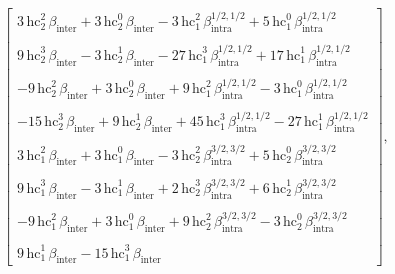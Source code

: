 \documentclass[aps,prb,onecolumn,nofootinbib,citeautoscript,10pt, showkeys]{revtex4-2}
\begin{document}
{\tiny
\begin{align*}
  \begin{bmatrix}
3 \, \text{hc}_2^2 \, \beta_{\text{inter}}
+ 3  \, \text{hc}_2^0 \,  \beta_{\text{inter}}
-3  \, \text{hc}_1^2\,  \beta_{\text{intra}}^{1/2, 1/2}
+5  \, \text{hc}_1^0 \,  \beta_{\text{intra}}^{1/2, 1/2} \\ \\
 9  \, \text{hc}_2^3 \,\beta_{\text{inter}}-3  \, \text{hc}_2^{1} \, \beta_{\text{inter}}
 -27  \, \text{hc}_1^3 \,\beta_{\text{intra}}^{1/2, 1/2}+
   17  \, \text{hc}_1^{1} \, \beta_{\text{intra}}^{1/2, 1/2} \\ \\
 -9  \, \text{hc}_2^2 \,\beta_{\text{inter}}+3  \, \text{hc}_2^0 \,  \beta_{\text{inter}}
 +9  \, \text{hc}_1^2 \,\beta_{\text{intra}}^{1/2, 1/2}
 -3 \, \text{hc}_1^0 \,  \beta_{\text{intra}}^{1/2, 1/2} \\ \\
 -15  \, \text{hc}_2^3 \,\beta_{\text{inter}}
 + 9  \, \text{hc}_2^{1} \, \beta_{\text{inter}}
 +45  \, \text{hc}_1^3 \, \beta_{\text{intra}}^{1/2, 1/2}
 -27  \, \text{hc}_1^{1} \, \beta_{\text{intra}}^{1/2, 1/2} \\ \\
 3  \, \text{hc}_1^2\, \beta_{\text{inter}}+3  \, \text{hc}_1^0 \,  \beta_{\text{inter}}
 -3  \, \text{hc}_2^2\, \beta_{\text{intra}}^{3/2, 3/2}
 +5 \, \text{hc}_2^0 \,  \beta_{\text{intra}}^{3/2, 3/2} \\ \\
 9  \, \text{hc}_1^3 \, \beta_{\text{inter}}
 -3  \, \text{hc}_1^{1} \, \beta_{\text{inter}}
 +2  \, \text{hc}_2^3 \, \beta_{\text{intra}}^{3/2, 3/2}
   +6  \, \text{hc}_2^{1} \, \beta_{\text{intra}}^{3/2, 3/2} \\ \\
 -9  \, \text{hc}_1^2\, \beta_{\text{inter}}+3  \, \text{hc}_1^0 \,  \beta_{\text{inter}}
 +9  \, \text{hc}_2^2 \,\beta_{\text{intra}}^{3/2, 3/2}-3
    \, \text{hc}_2^0 \,  \beta_{\text{intra}}^{3/2, 3/2} \\ \\
 9  \, \text{hc}_1^{1} \, \beta_{\text{inter}}-15  \, \text{hc}_1^3 \,\beta_{\text{inter}}   
  \end{bmatrix},
\end{align*}
}
\end{document}

